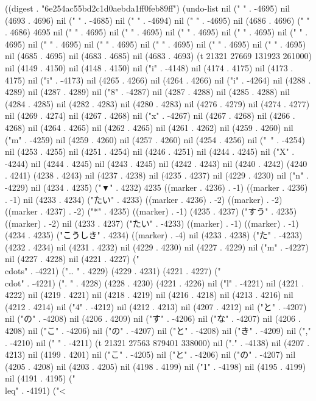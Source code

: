 
((digest . "6e254ac55bd2c1d0aebda1ff0feb89ff") (undo-list nil (" " . -4695) nil (4693 . 4696) nil ("
" . -4685) nil (" " . -4694) nil (" " . -4695) nil (4686 . 4696) ("         " . 4686) 4695 nil (" " . 4695) nil (" " . 4695) nil (" " . 4695) nil (" " . 4695) nil (" " . 4695) nil (" " . 4695) nil (" " . 4695) nil (" " . 4695) nil (" " . 4695) nil ("
" . 4695) nil (4685 . 4695) nil (4683 . 4685) nil (4683 . 4693) (t 21321 27669 131923 261000) nil (4149 . 4150) nil (4148 . 4150) nil ("i" . -4148) nil (4174 . 4175) nil (4173 . 4175) nil ("i" . -4173) nil (4265 . 4266) nil (4264 . 4266) nil ("i" . -4264) nil (4288 . 4289) nil (4287 . 4289) nil ("8" . -4287) nil (4287 . 4288) nil (4285 . 4288) nil (4284 . 4285) nil (4282 . 4283) nil (4280 . 4283) nil (4276 . 4279) nil (4274 . 4277) nil (4269 . 4274) nil (4267 . 4268) nil ("x" . -4267) nil (4267 . 4268) nil (4266 . 4268) nil (4264 . 4265) nil (4262 . 4265) nil (4261 . 4262) nil (4259 . 4260) nil ("m" . -4259) nil (4259 . 4260) nil (4257 . 4260) nil (4254 . 4256) nil ("~" . -4254) nil (4253 . 4255) nil (4251 . 4254) nil (4246 . 4251) nil (4244 . 4245) nil ("X" . -4244) nil (4244 . 4245) nil (4243 . 4245) nil (4242 . 4243) nil (4240 . 4242) (4240 . 4241) (4238 . 4243) nil (4237 . 4238) nil (4235 . 4237) nil (4229 . 4230) nil ("n" . -4229) nil (4234 . 4235) ("▼" . 4232) 4235 ((marker . 4236) . -1) ((marker . 4236) . -1) nil (4233 . 4234) ("たい" . 4233) ((marker . 4236) . -2) ((marker) . -2) ((marker . 4237) . -2) ("*" . 4235) ((marker) . -1) (4235 . 4237) ("すう" . 4235) ((marker) . -2) nil (4233 . 4237) ("たい" . -4233) ((marker) . -1) ((marker) . -1) (4234 . 4235) ("こうしき" . 4234) ((marker) . -4) nil (4233 . 4238) ("た" . -4233) (4232 . 4234) nil (4231 . 4232) nil (4229 . 4230) nil (4227 . 4229) nil ("m" . -4227) nil (4227 . 4228) nil (4221 . 4227) ("\\cdots" . -4221) ("…
" . 4229) (4229 . 4231) (4221 . 4227) ("\\cdot" . -4221) (".
" . 4228) (4228 . 4230) (4221 . 4226) nil ("l" . -4221) nil (4221 . 4222) nil (4219 . 4221) nil (4218 . 4219) nil (4216 . 4218) nil (4213 . 4216) nil (4212 . 4214) nil ("4" . -4212) nil (4212 . 4213) nil (4207 . 4212) nil ("と" . -4207) nil ("の" . -4208) nil (4206 . 4209) nil ("す" . -4206) nil ("な" . -4207) nil (4206 . 4208) nil ("こ" . -4206) nil ("の" . -4207) nil ("と" . -4208) nil ("き" . -4209) nil ("," . -4210) nil (" " . -4211) (t 21321 27563 879401 338000) nil ("." . -4138) nil (4207 . 4213) nil (4199 . 4201) nil ("こ" . -4205) nil ("と" . -4206) nil ("の" . -4207) nil (4205 . 4208) nil (4203 . 4205) nil (4198 . 4199) nil ("1" . -4198) nil (4195 . 4199) nil (4191 . 4195) ("\\leq" . -4191) ("<
